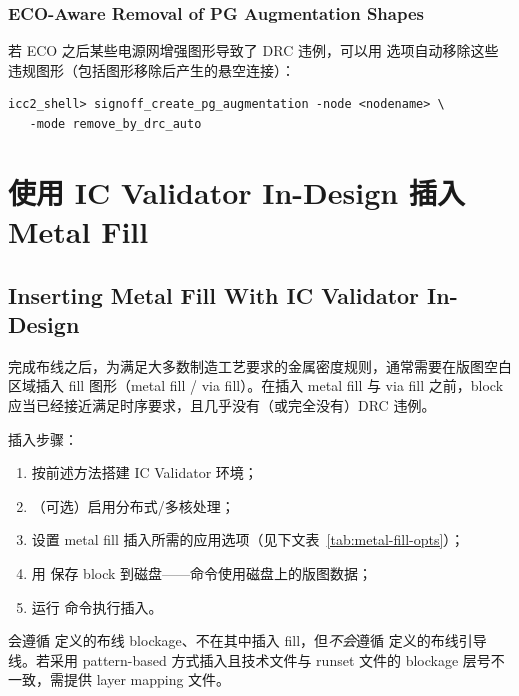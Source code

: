 \subsubsection*{ECO-Aware Removal of PG Augmentation Shapes}

若 ECO 之后某些电源网增强图形导致了 DRC 违例，可以用  选项自动移除这些违规图形（包括图形移除后产生的悬空连接）：

\begin{lstlisting}
icc2_shell> signoff_create_pg_augmentation -node <nodename> \
   -mode remove_by_drc_auto
\end{lstlisting}

\section{使用 IC Validator In-Design 插入 Metal Fill}
\subsection*{Inserting Metal Fill With IC Validator In-Design}

完成布线之后，为满足大多数制造工艺要求的金属密度规则，通常需要在版图空白区域插入 fill 图形（metal fill / via fill）。在插入 metal fill 与 via fill 之前，block 应当已经接近满足时序要求，且几乎没有（或完全没有）DRC 违例。

插入步骤：
\begin{enumerate}
  \item 按前述方法搭建 IC Validator 环境；
  \item （可选）启用分布式/多核处理；
  \item 设置 metal fill 插入所需的应用选项（见下文表~\ref{tab:metal-fill-opts}）；
  \item 用 \cmd{save\_block} 保存 block 到磁盘——命令使用磁盘上的版图数据；
  \item 运行  命令执行插入。
\end{enumerate}

\begin{noteBox}
 会遵循  定义的布线 blockage、不在其中插入 fill，但\emph{不会}遵循  定义的布线引导线。若采用 pattern-based 方式插入且技术文件与 runset 文件的 blockage 层号不一致，需提供 layer mapping 文件。
\end{noteBox}

